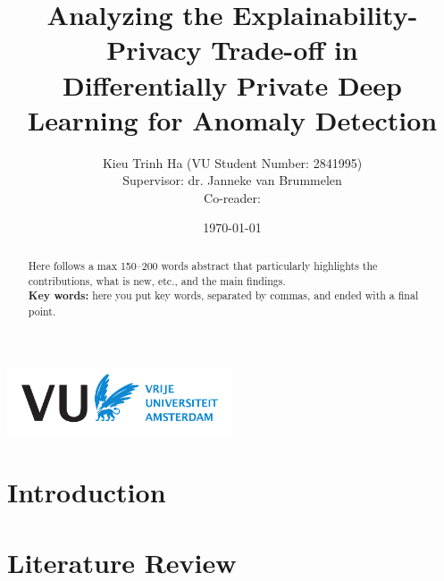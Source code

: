 \documentclass[a4paper,12pt]{article}
\title{Analyzing the Explainability-Privacy Trade-off in \\
Differentially Private Deep Learning for Anomaly Detection}
\author{
    Kieu Trinh Ha
    (VU Student Number: 2841995)
    \\[2ex]
    Supervisor: dr. Janneke van Brummelen\\
    Co-reader:
    }
\date{\today}
\theoremstyle{definition}
\begin{document}


\clearpage
\maketitle
\thispagestyle{empty}


\begin{abstract}
\noindent Here follows a max 150--200 words abstract that particularly highlights the contributions, what is new, etc., and the main findings.\\[1ex]
\noindent\textbf{Key words: } here you put key words, separated by commas, and ended with a final point. 
\end{abstract}

\vfill
\centerline{\includegraphics[width=0.5\textwidth]{vua.pdf}}
\clearpage



{
\tableofcontents
}

 \cleardoublepage {}
\clearpage

\section{Introduction} \label{s:intro}



\section{Literature Review} \label{s:lit_rev}
\end{document}
